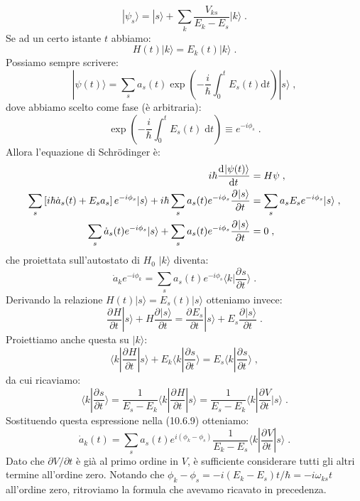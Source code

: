 \documentclass[12pt,a4paper]{report}
\theoremstyle{definition}
\newcommand{\pdev}[3][]{\frac{\partial^{#1} #2}{\partial #3^{#1}}}
\newcommand{\dev}[3][]{\frac{\mathrm{d}^{#1} #2}{\mathrm{d} #3^{#1}}}
\numberwithin{equation}{section}
\newcommand{\diff}[1][]{\mathrm{d}#1}
\newcommand{\bra}{\langle}
\newcommand{\ket}{\rangle}
\newcommand{\Sch}{Schrödinger}
\begin{document}
\begin{equation}
|\psi_s\ket=|s\ket+\sum_k\frac{V_{ks}}{E_k-E_s}|k\ket\;.
\end{equation}
Se ad un certo istante $t$ abbiamo:
\begin{equation}
H(t)|k\ket=E_k(t)|k\ket\;.
\end{equation}
Possiamo sempre scrivere:
\begin{equation}
|\psi(t)\ket=\sum_s a_s(t)\exp\left(-\frac{i}{\hbar}\int_0^t E_s(t)\diff{t}\right)|s\ket\;,
\end{equation}
dove abbiamo scelto come fase (è arbitraria):
\begin{equation}
\exp\left(-\frac{i}{\hbar}\int_0^t E_s(t)\;\diff{t}\right)\equiv e^{-i\phi_s}\;.
\end{equation}
Allora l'equazione di \Sch\; è:
\begin{align}
i\hbar\dev{|\psi(t)\ket}{t} &= H\psi \notag \;,\\
\sum_s\left[i\hbar\dot{a}_s(t)+E_sa_s\right]e^{-i\phi_s}|s\ket+i\hbar\sum_s a_s(t)e^{-i\phi_s}\pdev{|s\ket}{t} &= \sum_s a_sE_se^{-i\phi_s}|s\ket\;, \notag \\
\sum_s \dot{a}_s(t)e^{-i\phi_s}|s\ket +\sum_sa_s(t)e^{-i\phi_s}\pdev{|s\ket}{t}&=0\;,
\end{align}
che proiettata sull'autostato di $H_0$ $|k\ket$ diventa:
\begin{equation}
\dot{a}_ke^{-i\phi_k}=\sum_s a_s(t)e^{-i\phi_s}\bra k|\pdev{s}{t}\ket\;.
\end{equation}
Derivando la relazione $H(t)|s\ket=E_s(t)|s\ket$ otteniamo invece:
\begin{equation}
\pdev{H}{t}|s\ket+H\pdev{|s\ket}{t}=\pdev{E_s}{t}|s\ket+E_s\pdev{|s\ket}{t}\;.
\end{equation}
Proiettiamo anche questa su $|k\ket$:
\begin{equation}
\bra k|\pdev{H}{t}|s\ket+E_k\bra k|\pdev{s}{t}\ket=E_s\bra k|\pdev{s}{t}\ket\;,
\end{equation}
da cui ricaviamo:
\begin{equation}
\bra k|\pdev{s}{t}\ket=\frac{1}{E_s-E_k}\bra k|\pdev{H}{t}|s\ket=\frac{1}{E_s-E_k}\bra k|\pdev{V}{t}|s\ket\;.
\end{equation}
Sostituendo questa espressione nella (10.6.9) otteniamo:
\begin{equation}
\dot{a}_k(t)=\sum_s a_s(t)e^{i(\phi_k-\phi_s)}\frac{1}{E_k-E_s}\bra k|\pdev{V}{t}|s\ket\;.
\end{equation}
Dato che $\partial V/\partial t$ è già al primo ordine in $V$, è sufficiente considerare tutti gli altri termine all'ordine zero. Notando che $\phi_k-\phi_s=-i(E_k-E_s)t/\hbar=-i\omega_{ks}t$ all'ordine zero, ritroviamo la formula che avevamo ricavato in precedenza. \\
\end{document}
